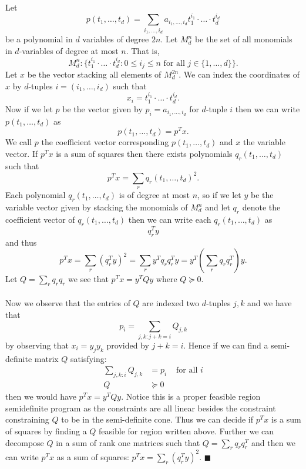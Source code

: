 \documentclass[letterpaper,12pt,oneside,onecolumn]{article}
\newcommand{\1}{\mathbbm{1}}
\begin{document}
\paragraph{}
Let $$p(t_1, \dots,t_d) = \sum_{i_1, \dots, i_d} a_{i_1, \dots, i_d} t_1^{i_1} \cdot \dots \cdot t_d^{i_d}$$ be a polynomial in $d$ variables of degree $2n$. Let $M_d^{n}$ be the set of all monomials in $d$-variables of degree at most $n$. That is,
$$M_d^{n} : \{ t_1^{i_1}\cdot\dots \cdot t_d^{i_d} : 0 \leq i_j \leq n \text{ for all } j \in \{1, \dots, d\}\}.$$
Let $x$ be the vector stacking all elements of $M_d^{2n}$. We can index the coordinates of $x$ by $d$-tuples $i = (i_1, \dots, i_d)$ such that
$$x_i = t_1^{i_1}\cdot \dots\cdot t_d^{i_d}.$$
Now if we let $p$ be the vector given by $p_i = a_{i_1, \dots, i_d}$ for $d$-tuple $i$ then we can write $p(t_1, \dots, t_d)$ as
$$p(t_1, \dots, t_d) = p^Tx.$$
We call $p$ the coefficient vector corresponding $p(t_1, \dots, t_d)$ and $x$ the variable vector. If $p^Tx$ is a sum of squares then there exists polynomials $q_r(t_1,\dots,t_d)$ such that
$$p^Tx = \sum_r q_r(t_1,\dots, t_d)^2.$$
Each polynomial $q_r(t_1, \dots, t_d)$ is of degree at most $n$, so if we let $y$ be the variable vector given by stacking the monomials of $M_d^n$ and let $q_r$ denote the coefficient vector of $q_r(t_1,\dots,t_d)$ then we can write each $q_r(t_1,\dots,t_d)$ as
$$q_r^Ty$$
and thus
$$p^Tx = \sum_r (q_r^Ty)^2 = \sum_r y^Tq_rq_r^Ty = y^T(\sum_r q_rq_r^T)y.$$
Let $Q = \sum_r q_rq_r$ we see that $p^Tx = y^TQy$ where $Q \succcurlyeq 0$.
\paragraph{}
Now we observe that the entries of $Q$ are indexed two $d$-tuples $j,k$ and we have that
$$p_i = \sum_{j,k : j+k = i} Q_{j,k}$$
by observing that $x_i = y_j y_k$ provided by $j + k = i$. Hence if we can find a semi-definite matrix $Q$ satisfying:
\begin{align*}
\sum_{j,k: i} Q_{j,k} &= p_i &\text{ for all $i$}\\
Q&\succcurlyeq 0 
\end{align*}
then we would have $p^Tx = y^TQy$. Notice this is a proper feasible region semidefinite program as the constraints are all linear besides the constraint constraining $Q$ to be in the semi-definite cone. Thus we can decide if $p^Tx$ is a sum of squares by finding a $Q$ feasible for region written above. Further we can decompose $Q$ in a sum of rank one matrices such that $Q = \sum_r q_rq_r^T$ and then we can write $p^Tx$ as a sum of squares: $p^Tx = \sum_r (q_r^Ty)^2$. $\blacksquare$
\end{document}
